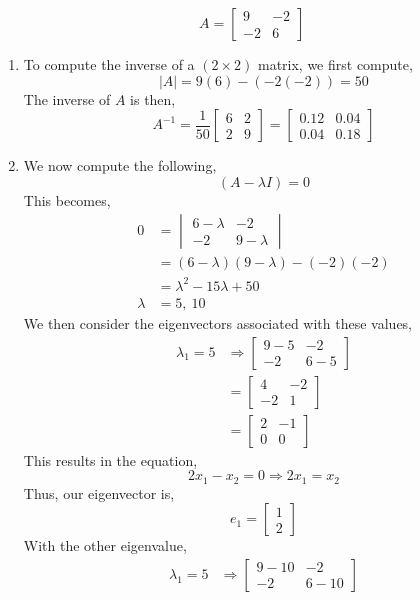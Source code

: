 \documentclass[letterpaper,10pt]{article}
\begin{document}
\begin{enumerate}
\[A=\begin{bmatrix}
9 & -2\\-2 & 6
\end{bmatrix} \]
\begin{enumerate}
\item To compute the inverse of a $(2\times 2)$ matrix, we first compute,
\[|A|=9(6)-(-2(-2))=50\]
The inverse of $A$ is then,
\[A^{-1}=\frac{1}{50}\begin{bmatrix}
6 & 2\\2 & 9
\end{bmatrix}=\begin{bmatrix}
0.12 & 0.04\\ 0.04 & 0.18
\end{bmatrix} \]
\item We now compute the following,
\[(A-\lambda I)=0\]
This becomes,
\begin{align*}
0 &= \begin{vmatrix}
6-\lambda & -2\\-2 & 9-\lambda
\end{vmatrix}\\
&=(6-\lambda)(9-\lambda)-(-2)(-2)\\
&=\lambda^2-15\lambda+50\\
\lambda &= 5,\ 10
\end{align*}
We then consider the eigenvectors associated with these values,
\begin{align*}
\lambda_1=5 &\Rightarrow \begin{bmatrix}
9-5 & -2\\-2 & 6-5
\end{bmatrix}\\
&=\begin{bmatrix}
4 & -2\\ -2 & 1
\end{bmatrix}\\
&= \begin{bmatrix}
2 & -1\\ 0 & 0
\end{bmatrix}
\end{align*}
This results in the equation,
\[2x_1-x_2=0 \Rightarrow 2x_1=x_2\]
Thus, our eigenvector is,
\[e_1 = \begin{bmatrix}
1\\2
\end{bmatrix}\]
With the other eigenvalue,
\begin{align*}
\lambda_1=5 &\Rightarrow \begin{bmatrix}
9-10 & -2\\-2 & 6-10

\end{bmatrix}
\end{align*}
\end{enumerate}
\end{enumerate}
\end{document}
